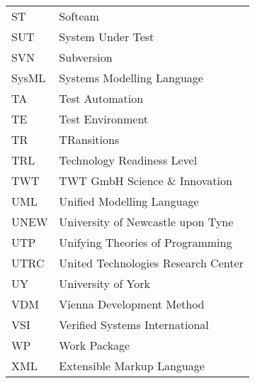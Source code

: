 \begin{longtable}{ll}
ST      &Softeam\\
SUT     &System Under Test\\
SVN	&Subversion\\
SysML	&Systems Modelling Language\\
TA      &Test Automation\\
TE & Test Environment\\
TR & TRansitions \\
TRL     &Technology Readiness Level\\
TWT & TWT GmbH Science \& Innovation\\
UML	&Unified Modelling Language\\
UNEW	&University of Newcastle upon Tyne\\
UTP     &Unifying Theories of Programming\\
UTRC    & United Technologies Research Center\\
UY      & University of York\\
VDM     &Vienna Development Method\\
VSI     & Verified Systems International\\
WP	&Work Package\\
XML	&Extensible Markup Language\\
\end{longtable}
